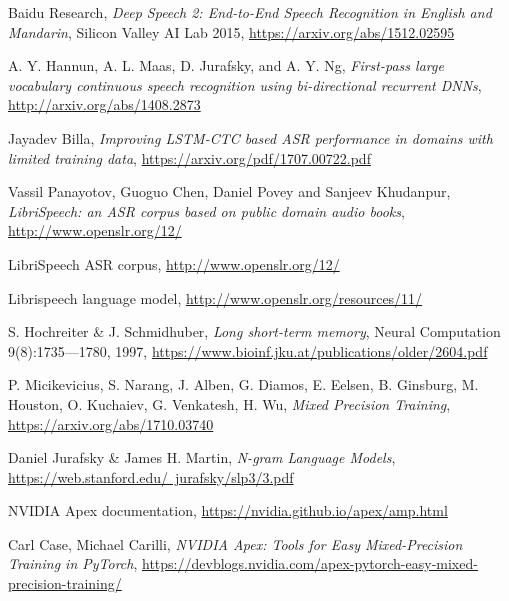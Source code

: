 \documentclass[licencjacka,en]{pracamgr}
\begin{document}
\begin{thebibliography}{99}
		 Baidu Research, \textit{Deep Speech 2: End-to-End Speech Recognition in English and Mandarin}, Silicon Valley AI Lab 2015, \href{https://arxiv.org/abs/1512.02595}{https://arxiv.org/abs/1512.02595}
		
		 A. Y. Hannun, A. L. Maas, D. Jurafsky, and A. Y. Ng, \textit{First-pass large vocabulary continuous speech recognition using bi-directional recurrent DNNs}, \href{http://arxiv.org/abs/1408.2873}{http://arxiv.org/abs/1408.2873}
		
		 Jayadev Billa, \textit{Improving LSTM-CTC based ASR performance in domains with limited training data}, 
		\href{https://arxiv.org/pdf/1707.00722.pdf}{https://arxiv.org/pdf/1707.00722.pdf}
		
		 Vassil Panayotov, Guoguo Chen, Daniel Povey and Sanjeev Khudanpur, \textit{LibriSpeech: an ASR corpus based on public domain audio books}, 
		\href{http://www.openslr.org/12/}{http://www.openslr.org/12/}
		
		 LibriSpeech ASR corpus,  \href{http://www.openslr.org/12/}{http://www.openslr.org/12/}
		
		 Librispeech language model,
		\href{http://www.openslr.org/resources/11/}{http://www.openslr.org/resources/11/}
		
		 S. Hochreiter \& J. Schmidhuber, \textit{Long short-term memory}, Neural Computation 9(8):1735—1780, 1997,  \href{https://www.bioinf.jku.at/publications/older/2604.pdf}{https://www.bioinf.jku.at/publications/older/2604.pdf}
		
		  P. Micikevicius, S. Narang, J. Alben, G. Diamos, E. Eelsen, B. Ginsburg, M. Houston, O. Kuchaiev, G. Venkatesh, H. Wu, \textit{Mixed Precision Training},
		\href{https://arxiv.org/abs/1710.03740}{https://arxiv.org/abs/1710.03740}
		
		 Daniel Jurafsky \& James H. Martin, \textit{N-gram Language Models}, 	\href{https://web.stanford.edu/~jurafsky/slp3/3.pdf}{https://web.stanford.edu/~jurafsky/slp3/3.pdf}
		
		NVIDIA Apex documentation,
		\href{https://nvidia.github.io/apex/amp.html}{https://nvidia.github.io/apex/amp.html}
		
		
		Carl Case, Michael Carilli, \textit{NVIDIA Apex: Tools for Easy Mixed-Precision Training in PyTorch}, 
		\href{https://devblogs.nvidia.com/apex-pytorch-easy-mixed-precision-training/}{https://devblogs.nvidia.com/apex-pytorch-easy-mixed-precision-training/}
		

\end{thebibliography}
\end{document}
